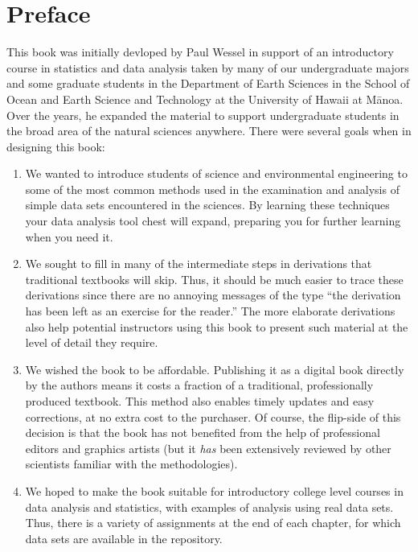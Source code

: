 \chapter*{Preface}

This book was initially devloped by Paul Wessel in support of an introductory course in statistics
and data analysis taken by many of our undergraduate majors and some graduate students in the Department of
Earth Sciences in the School of Ocean and Earth Science and Technology at
the University of Hawaii at M\={a}noa.  Over the years, he
expanded the material to support undergraduate students in the broad area of the natural sciences
anywhere.  There were several goals when in designing this book:
\begin{enumerate}
\item We wanted to introduce students of science and environmental engineering to some
   of the most common methods used in the examination and analysis of simple data sets
   encountered in the sciences.  By learning these techniques your data analysis tool
   chest will expand, preparing you for further learning when you need it.
\item We sought to fill in many of the intermediate steps in derivations that traditional
   textbooks will skip.  Thus, it should be much easier to trace these derivations since there
   are no annoying messages of the type ``the derivation has been left as an exercise for the reader.''
   The more elaborate derivations also help potential instructors using this book to present such
   material at the level of detail they require.
\item We wished the book to be affordable.  Publishing it as a digital book directly by the authors
   means it costs a fraction of a traditional, professionally produced textbook.  This method also enables timely updates
   and easy corrections, at no extra cost to the purchaser.  Of course, the flip-side of this decision
   is that the book has not benefited from the help of professional editors and graphics artists
   (but it \emph{has} been extensively reviewed by other scientists familiar with the methodologies).
\item We hoped to make the book suitable for introductory college level courses in data analysis and statistics, with
   examples of analysis using real data sets.  Thus, there is a
   variety of assignments at the end of each chapter, for which data sets are available in the repository.
\end{enumerate}

